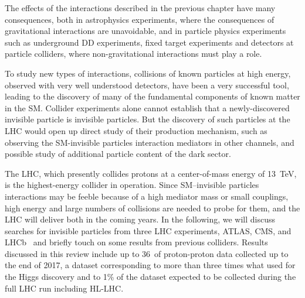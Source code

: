 
The effects of the interactions described in the previous chapter have many consequences, both in astrophysics experiments, where the consequences of gravitational interactions are unavoidable, and in particle physics experiments such as underground DD experiments, fixed target experiments and detectors at particle colliders, where non-gravitational interactions must play a role. 

To study new types of interactions, collisions of known particles at high energy, observed with very well understood detectors, have been a very successful tool, leading to the discovery of many of the fundamental components of known matter in the SM. %
Collider experiments alone cannot establish that a newly-discovered invisible particle is invisible particles. But the discovery of such particles at the LHC would open up direct study of their production mechanism, such as observing the SM-invisible particles interaction mediators in other channels, and possible study of additional particle content of the dark sector. %

The LHC, which presently collides protons at a center-of-mass energy of 13~TeV, is the highest-energy collider in operation.
Since SM--invisible particles interactions may be feeble because of a high mediator mass or small couplings, high energy and large numbers of collisions are needed to probe for them, and the LHC will deliver both in the coming years. 
In the following, we will discuss searches for invisible particles from three LHC experiments, ATLAS, CMS, and LHCb~\cite{ATLAS2008,CMS2008,LHC2008} and briefly touch on some results from previous colliders. %
Results discussed in this review include up to 36~\ifb of proton-proton data collected up to the end of 2017, a dataset corresponding to more than three times what used for the Higgs discovery and to 1\% of the dataset expected to be collected during the full LHC run including HL-LHC. 

